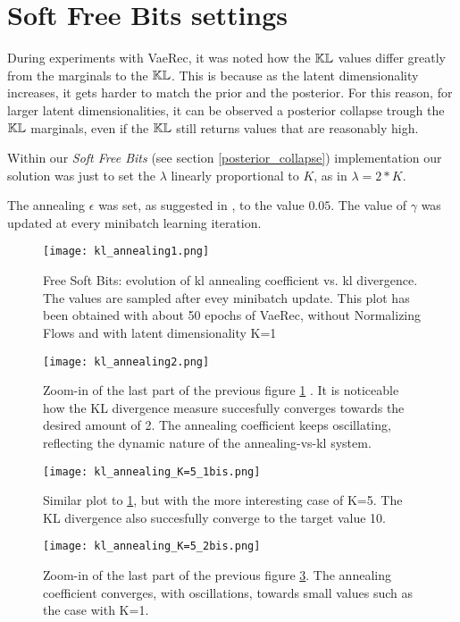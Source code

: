 \section{Soft Free Bits settings}

During experiments with VaeRec, it was noted how the $\mathbb{KL}$ values differ greatly from
the marginals to the $\mathbb{KL}$.
This is because as the latent dimensionality increases, it gets harder to match
the prior and the posterior.
For this reason, for larger latent dimensionalities,
it can be observed a posterior collapse trough the $\mathbb{KL}$ marginals,
even if the $\mathbb{KL}$ still returns values that are reasonably high.

Within our \emph{Soft Free Bits} (see section \ref{posterior_collapse}) implementation
our solution was just to set the $\lambda$ linearly proportional to $K$, as in $\lambda=2*K$.

The annealing $\epsilon$ was set, as suggested in \cite{1611.02731}, to the value $0.05$.
The value of $\gamma$ was updated at every minibatch learning iteration.

\begin{figure}[H]
\centering
\texttt{[image: kl\_annealing1.png]}
\caption{Free Soft Bits: evolution of kl annealing coefficient vs. kl divergence. The values are sampled after evey minibatch update. This plot has been obtained with about 50 epochs of VaeRec, without Normalizing Flows and with latent dimensionality K=1}
\label{kl_annealing1}
\end{figure}


\begin{figure}[H]
\centering
\texttt{[image: kl\_annealing2.png]}
\caption{Zoom-in of the last part of the previous figure \ref{kl_annealing1} . It is noticeable how the KL divergence measure succesfully converges towards the desired amount of 2. The annealing coefficient keeps oscillating, reflecting the dynamic nature of the annealing-vs-kl system.}
\label{kl_annealing2}
\end{figure}

\begin{figure}[H]
\centering
\texttt{[image: kl\_annealing\_K=5\_1bis.png]}
\caption{Similar plot to \ref{kl_annealing1}, but with the more interesting case of K=5. The KL divergence also succesfully converge to the target value 10.}
\label{kl_annealing_K5_1}
\end{figure}

\begin{figure}[H]
\centering
\texttt{[image: kl\_annealing\_K=5\_2bis.png]}
\caption{Zoom-in of the last part of the previous figure \ref{kl_annealing_K5_1}.  The annealing coefficient converges, with oscillations, towards small values such as the case with K=1.}
\label{kl_annealing2}
\end{figure}

